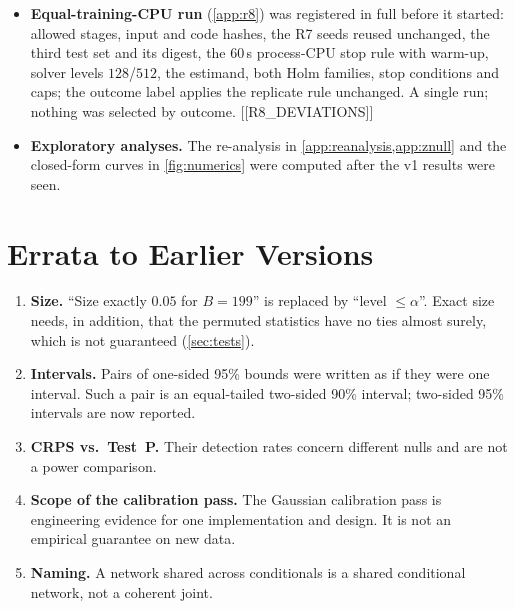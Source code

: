 \documentclass{article}
\theoremstyle{plain}
\theoremstyle{definition}
\theoremstyle{remark}
\begin{document}
\begin{itemize}
\begin{itemize}
  \item Primary null: $R=400$ with a tolerance criterion. The other null cells use Bonferroni excess flags.
  \item Seeds include the test level.
  \item The gate's operating characteristics were computed in advance: P(pass $\mid$ valid, power $0.3$) $=\numOCvThreeGate$.
  \item A timing smoke with a different seed preceded the single run and is not reported.
  \end{itemize}
\item \textbf{Equal-training-CPU run} (\cref{app:r8}) was registered in full before it started: allowed stages, input and code hashes, the R7 seeds reused unchanged, the third test set and its digest, the $60$\,s process-CPU stop rule with warm-up, solver levels $128$/$512$, the estimand, both Holm families, stop conditions and caps; the outcome label applies the replicate rule unchanged. A single run; nothing was selected by outcome. [[R8_DEVIATIONS]]
\item \textbf{Exploratory analyses.} The re-analysis in \cref{app:reanalysis,app:znull} and the closed-form curves in \cref{fig:numerics} were computed after the v1 results were seen.
\end{itemize}

\section{Errata to Earlier Versions}
\label{app:errata}
\begin{enumerate}
\item \textbf{Size.} ``Size exactly $0.05$ for $B=199$'' is replaced by ``level $\le\alpha$''. Exact size needs, in addition, that the permuted statistics have no ties almost surely, which is not guaranteed (\cref{sec:tests}).
\item \textbf{Intervals.} Pairs of one-sided 95\% bounds were written as if they were one interval. Such a pair is an equal-tailed two-sided 90\% interval; two-sided 95\% intervals are now reported.
\item \textbf{CRPS vs.\ Test~P.} Their detection rates concern different nulls and are not a power comparison.
\item \textbf{Scope of the calibration pass.} The Gaussian calibration pass is engineering evidence for one implementation and design. It is not an empirical guarantee on new data.
\item \textbf{Naming.} A network shared across conditionals is a shared conditional network, not a coherent joint.
\end{enumerate}
\end{document}

